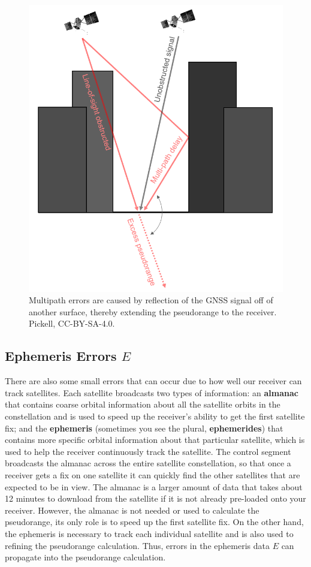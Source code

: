\documentclass[
]{book}
\begin{document}
\begin{figure}
\includegraphics[width=0.75\linewidth]{images/14-GNSS-multipath-error} \caption{Multipath errors are caused by reflection of the GNSS signal off of another surface, thereby extending the pseudorange to the receiver. Pickell, CC-BY-SA-4.0.}\label{fig:14-GNSS-multipath-error}
\end{figure}

\hypertarget{ephemeris-errors-e}{%
\subsection{\texorpdfstring{Ephemeris Errors \(E\)}{Ephemeris Errors E}}\label{ephemeris-errors-e}}

There are also some small errors that can occur due to how well our receiver can track satellites. Each satellite broadcasts two types of information: an \textbf{almanac} that contains coarse orbital information about all the satellite orbits in the constellation and is used to speed up the receiver's ability to get the first satellite fix; and the \textbf{ephemeris} (sometimes you see the plural, \textbf{ephemerides}) that contains more specific orbital information about that particular satellite, which is used to help the receiver continuously track the satellite. The control segment broadcasts the almanac across the entire satellite constellation, so that once a receiver gets a fix on one satellite it can quickly find the other satellites that are expected to be in view. The almanac is a larger amount of data that takes about 12 minutes to download from the satellite if it is not already pre-loaded onto your receiver. However, the almanac is not needed or used to calculate the pseudorange, its only role is to speed up the first satellite fix. On the other hand, the ephemeris is necessary to track each individual satellite and is also used to refining the pseudorange calculation. Thus, errors in the ephemeris data \(E\) can propagate into the pseudorange calculation.
\end{document}

